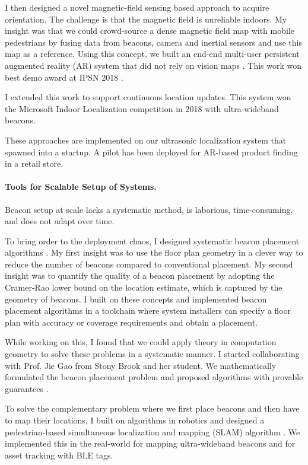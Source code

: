 \documentclass[10pt]{article}
\begin{document}
I then designed a novel magnetic-field sensing based approach to acquire orientation. The challenge is that the magnetic field is unreliable indoors. My insight was that we could crowd-source a dense magnetic field map with mobile pedestrians by fusing data from beacons, camera and inertial sensors and use this map as a reference.  Using this concept, we built an end-end multi-user persistent augmented reality (AR) system that did not rely on vision maps \cite{mobileAR}. This work won best demo award at IPSN 2018 \cite{rajagopal2018welcome}. 

I extended this work to support continuous location updates. This system won the Microsoft Indoor Localization competition in 2018 with ultra-wideband beacons.


These approaches are implemented on our ultrasonic localization system that spawned into a startup. A pilot has been deployed for AR-based product finding in a retail store. 

\paragraph{Tools for Scalable Setup of Systems.  }
Beacon setup at scale lacks a systematic method, is laborious, time-consuming, and does not adapt over time. 

To bring order to the deployment chaos, I designed systematic beacon placement algorithms \cite{rajagopal2016beacon}. 
My first insight was to use the floor plan geometry in a clever way to reduce the number of beacons compared to conventional placement. 
My second insight was to quantify the quality of a beacon placement by adopting the Cramer-Rao lower bound on the location estimate, which is captured by the geometry of beacons. I built on these concepts and implemented beacon placement algorithms in a toolchain where system installers can specify a floor plan with accuracy or coverage requirements and obtain a placement. 

While working on this, I found that we could apply theory in computation geometry to solve these problems in a systematic manner.  
I started collaborating with Prof. Jie Gao from Stony Brook and her student. 
We mathematically formulated the beacon placement problem and proposed algorithms with provable guarantees \cite{beaconplacementtheory}.  

To solve the complementary problem where we first place beacons and then have to map their locations, I built on algorithms in robotics and designed a pedestrian-based simultaneous localization and mapping (SLAM) algorithm \cite{mobileAR}. We implemented this in the real-world for mapping ultra-wideband beacons and for asset tracking with BLE tags. 
\end{document}
